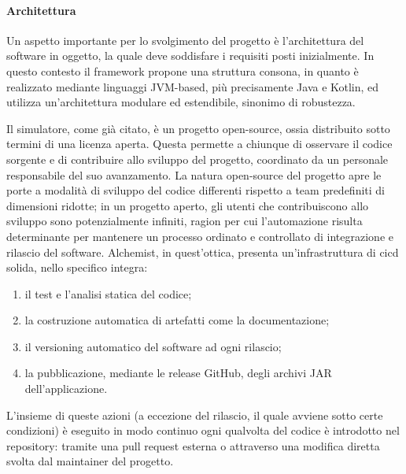 \paragraph{Architettura} Un aspetto importante per lo svolgimento del progetto è l'architettura del software in oggetto, la quale deve soddisfare i requisiti posti inizialmente. In questo contesto il framework propone una struttura consona, in quanto è realizzato mediante linguaggi JVM-based, più precisamente Java e Kotlin, ed utilizza un'architettura modulare ed estendibile, sinonimo di robustezza. 

Il simulatore, come già citato, è un progetto open-source, ossia distribuito sotto termini di una licenza aperta. Questa permette a chiunque di osservare il codice sorgente e di contribuire allo sviluppo del progetto, coordinato da un personale responsabile del suo avanzamento. La natura open-source del progetto apre le porte a modalità di sviluppo del codice differenti rispetto a team predefiniti di dimensioni ridotte; in un progetto aperto, gli utenti che contribuiscono allo sviluppo sono potenzialmente infiniti, ragion per cui l'automazione risulta determinante per mantenere un processo ordinato e controllato di integrazione e rilascio del software. Alchemist, in quest'ottica, presenta un'infrastruttura di \ac{cicd} solida, nello specifico integra:
\begin{enumerate}
	\item il test e l'analisi statica del codice;
	\item la costruzione automatica di artefatti come la documentazione;
	\item il versioning automatico del software ad ogni rilascio;
	\item la pubblicazione, mediante le release GitHub, degli archivi JAR dell'applicazione.
\end{enumerate}
L'insieme di queste azioni (a eccezione del rilascio, il quale avviene sotto certe condizioni) è eseguito in modo continuo ogni qualvolta del codice è introdotto nel repository: tramite una pull request esterna o attraverso una modifica diretta svolta dal maintainer del progetto.

